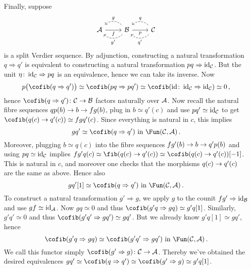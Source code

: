 \documentclass[a4paper, 10pt, oneside, DIV=9, chapterprefix=true, numbers=enddot,bibliography=totoc]{scrbook}
\begin{document}
\begin{proof*}
	Finally, suppose
	\begin{equation*}
		\begin{tikzcd}
			\Aa\rar["f"'] & \Bb\rar["p"']\lar[dashed,bend right=45,"g"']\lar[dashed,bend left=45,"g'"] & \Cc\lar[dashed,bend right=45,"q"']\lar[dashed,bend left=45,"q'"]
		\end{tikzcd}
	\end{equation*}
	is a split Verdier sequence. By adjunction, constructing a natural transformation $q\Rightarrow q'$ is equivalent to constructing a natural transformation $pq\Rightarrow \operatorname{id}_{\mathcal{C}}$. But the unit $\eta\colon \operatorname{id}_{\mathcal{C}}\Rightarrow pq$ is an equivalence, hence we can take its inverse. Now
	\begin{equation*}
		p\big(\cofib(q\Rightarrow q')\big)\simeq \cofib(pq\Rightarrow pq')\simeq \cofib(\id\colon \id_\Cc\Rightarrow\id_\Cc)\simeq 0\,,
	\end{equation*}
	hence $\cofib(q\Rightarrow q')\colon \Cc\morphism \Bb$ factors naturally over $\mathcal{A}$. Now recall the natural fibre sequences $qp(b)\morphism b\morphism fg(b)$, plug in $b\simeq q'(c)$ and use $pq'\simeq \operatorname{id}_{\mathcal{C}}$ to get $\cofib(q(c)\morphism q'(c))\simeq fgq'(c)$. Since everything is natural in $c$, this implies
	\begin{equation*}
		gq'\simeq \cofib(q\Rightarrow q')\text{ in }\Fun(\Cc,\Aa)\,.
	\end{equation*}
	Moreover, plugging $b\simeq q(c)$ into the fibre sequences $fg'(b)\morphism b\morphism q'p(b)$ and using $pq\simeq \operatorname{id}_{\mathcal{C}}$ implies $fg'q(c)\simeq \fib(q(c)\morphism q'(c))\simeq \cofib(q(c)\morphism q'(c))[-1]$. This is natural in $c$, and moreover one checks that the morphisms $q(c)\morphism q'(c)$ are the same as above. Hence also
	\begin{equation*}
		gq'[1]\simeq \cofib(q\Rightarrow q')\text{ in }\Fun(\Cc,\Aa)\,.
	\end{equation*}
	To construct a natural transformation $g'\Rightarrow g$, we apply $g$ to the counit $fg'\Rightarrow \operatorname{id}_{\mathcal{B}}$ and use $gf\simeq \operatorname{id}_{\mathcal{A}}$. Now $gq\simeq 0$ and thus $\cofib(g'q\Rightarrow gq)\simeq g'q[1]$. Similarly, $g'q'\simeq 0$ and thus $\cofib(g'q'\Rightarrow gq')\simeq gq'$. But we already know $g'q[1]\simeq gq'$, hence 
	\begin{equation*}
		\cofib(g'q\Rightarrow gq) \simeq \cofib(g'q'\Rightarrow gq')\text{ in }\Fun(\Cc,\Aa)\,.
	\end{equation*}
	We call this functor simply $\cofib(g'\Rightarrow g)\colon \Cc\morphism \Aa$. Thereby we've obtained the desired equivalences $gq'\simeq \cofib(q\Rightarrow q') \simeq \cofib(g'\Rightarrow g)\simeq g'q[1]$.
	

\end{proof*}
\end{document}
